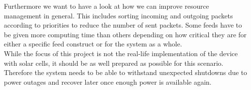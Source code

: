 Furthermore we want to have a look at how we can improve resource management in general. This includes sorting incoming and outgoing packets according to priorities to reduce the number of sent packets. Some feeds have to be given more computing time than others depending on how critical they are for either a specific feed construct or for the system as a whole. \\ While the focus of this project is not the real-life implementation of the device with solar cells, it should be as well prepared as possible for this scenario. Therefore the system needs to be able to withstand unexpected shutdowns due to power outages and recover later once enough power is available again. \\ 




